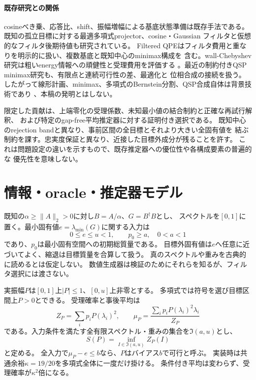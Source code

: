 \documentclass[11pt,a4paper]{article}
\begin{document}
\paragraph{既存研究との関係}
cosineべき乗、応答比、shift、振幅増幅による基底状態準備は既存手法である\cite{Ge}。
既知の孤立目標に対する最適多項式projector\cite{LinTong}、cosine・Gaussian
フィルタと仮想的なフィルタ後期待値\cite{Lu,He}も研究されている。
Filtered QPEはフィルタ費用と重なりを明示的に扱い、複数基底と既知中心のminimax構成を
含む\cite{FQPE}。wall-Chebyshev研究は粗いenergy情報への頑健性と受理費用を評価する
\cite{Wall}。最近の制約付きQSP minimax研究も、有限点と連続可行性の差、最適化と
位相合成の接続を扱う\cite{Constrained}。
したがって線形計画、minimax、多項式のBernstein分割、QSP合成自体は背景技術であり
\cite{Charnes,Farouki,DongPhase}、本稿の発明とはしない。

限定した貢献は、上端零化の受理係数、未知最小値の結合制約と正確な再試行解釈、
および特定のgap-free平均推定器に対する証明付き選択である。
既知中心のrejection bandと異なり、事前区間の全目標とそれより大きい全固有値を
結ぶ制約を課す。忠実度保証と異なり、近接した目標外成分が残ることを許す。
これは問題設定の違いを示すもので、既存推定器への優位性や各構成要素の普遍的な
優先性を意味しない。

\section{情報・oracle・推定器モデル}\label{sec:model}
既知の$\alpha\geq\|A\|_2>0$に対し$B=A/\alpha$、$G=B^\dagger B$とし、
スペクトルを$[0,1]$に置く。最小固有値$e=\lambda_{\min}(G)$に関する入力は
\begin{equation}\label{eq:prior}
 0\leq e\leq u<1,\qquad p_0\geq a,\quad 0<a<1
\end{equation}
であり、$p_0$は最小固有空間への初期総質量である。
目標外固有値は$e$へ任意に近づいてよく、縮退は目標質量を合算して扱う。
真のスペクトルや重みを古典的に読めるとは仮定しない。
数値生成器は検証のためにそれらを知るが、フィルタ選択には渡さない。

実振幅$P$は$[0,1]$上$|P|\leq1$、$[0,u]$上非零とする。
多項式では符号を選び目標区間上$P>0$とできる。
受理確率と事後平均は
\[
 Z_P=\sum_i p_iP(\lambda_i)^2,\qquad
 \mu_P=\frac{\sum_i p_iP(\lambda_i)^2\lambda_i}{Z_P}
\]
である。入力条件を満たす全有限スペクトル・重みの集合を$\mathfrak I(a,u)$とし、
\[
S(P)=\inf_{I\in\mathfrak I(a,u)}Z_P(I)
\]
と定める。
全入力で$\mu_P-e\leq b$なら、$P$はバイアス$b$で可行と呼ぶ。
実装時は共通余裕$\kappa=19/20$を多項式全体に一度だけ掛ける。
条件付き平均は変わらず、受理確率が$\kappa^2$倍になる。
\end{document}
